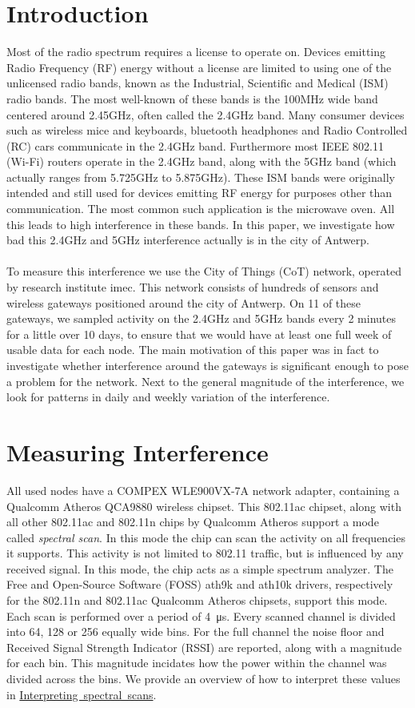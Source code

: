 \documentclass[a4paper, 11pt]{article}
\begin{document}
\section{Introduction}
Most of the radio spectrum requires a license to operate on. Devices emitting Radio Frequency (RF) energy without a license are limited to using one of the unlicensed radio bands, known as the Industrial, Scientific and Medical (ISM) radio bands. The most well-known of these bands is the 100MHz wide band centered around 2.45GHz, often called the 2.4GHz band. Many consumer devices such as wireless mice and keyboards, bluetooth headphones and Radio Controlled (RC) cars communicate in the 2.4GHz band. Furthermore most IEEE 802.11 (Wi-Fi) routers operate in the 2.4GHz band, along with the 5GHz band (which actually ranges from 5.725GHz to 5.875GHz). These ISM bands were originally intended and still used for devices emitting RF energy for purposes other than communication. The most common such application is the microwave oven. All this leads to high interference in these bands. In this paper, we investigate how bad this 2.4GHz and 5GHz interference actually is in the city of Antwerp. \\ \\
To measure this interference we use the City of Things (CoT) network, operated by research institute imec. This network consists of hundreds of sensors and wireless gateways positioned around the city of Antwerp. On 11 of these gateways, we sampled activity on the 2.4GHz and 5GHz bands every 2 minutes for a little over 10 days, to ensure that we would have at least one full week of usable data for each node. The main motivation of this paper was in fact to investigate whether interference around the gateways is significant enough to pose a problem for the network. Next to the general magnitude of the interference, we look for patterns in daily and weekly variation of the interference.
\section{Measuring Interference}
All used nodes have a COMPEX WLE900VX-7A network adapter, containing a Qualcomm Atheros QCA9880 wireless chipset. This 802.11ac chipset, along with all other 802.11ac and 802.11n chips by Qualcomm Atheros support a mode called \textit{spectral scan}. In this mode the chip can scan the activity on all frequencies it supports. This activity is not limited to 802.11 traffic, but is influenced by any received signal. In this mode, the chip acts as a simple spectrum analyzer. The Free and Open-Source Software (FOSS) ath9k and ath10k drivers, respectively for the 802.11n and 802.11ac Qualcomm Atheros chipsets, support this mode. Each scan is performed over a period of \SI{4}{\micro\second}. Every scanned channel is divided into 64, 128 or 256 equally wide bins. For the full channel the noise floor and Received Signal Strength Indicator (RSSI) are reported, along with a magnitude for each bin. This magnitude incidates  how the power within the channel was divided across the bins. We provide an overview of how to interpret these values in \mbox{\hyperref[sec:interpret]{Interpreting spectral scans}}. \\
\end{document}

